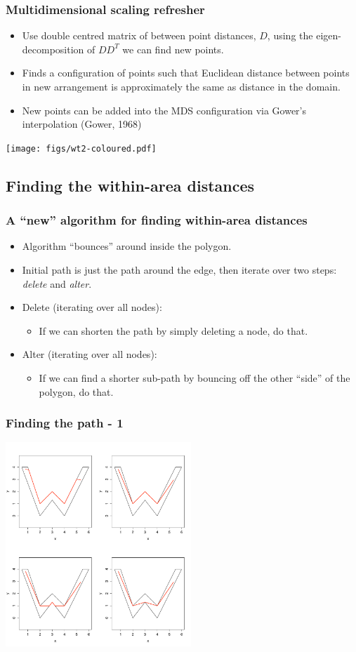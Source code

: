 \documentclass[ignorenonframetext]{beamer} %
\newcommand{\bi}{\begin{itemize}}
\newcommand{\ei}{\end{itemize}}
\begin{document}
\begin{frame}
	\frametitle{Multidimensional scaling refresher}
       \bi
         \item Use double centred matrix of between point distances, $D$, using the eigen-decomposition of $DD^T$ we can find new points.
         \item Finds a configuration of points such that Euclidean distance between points in new arrangement is approximately the same as distance in the domain.
          \item New points can be added into the MDS configuration via Gower's interpolation (Gower, 1968)
        \ei
            \centering
              \texttt{[image: figs/wt2-coloured.pdf]}\\
        
\end{frame}

\subsection{Finding the within-area distances}

\begin{frame}
	\frametitle{A ``new'' algorithm for finding within-area distances}
	\bi
		\item Algorithm ``bounces'' around inside the polygon.
		\item Initial path is just the path around the edge, then iterate over two steps: \textit{delete} and \textit{alter}.
		\item Delete (iterating over all nodes):
			\bi \item If we can shorten the path by simply deleting a node, do that.
			\ei
		\item Alter (iterating over all nodes):
			\bi \item If we can find a shorter sub-path by bouncing off the other ``side'' of the polygon, do that.
			\ei
	\ei
\end{frame}



\begin{frame}
	\frametitle{Finding the path - 1}
            \centering
              \includegraphics[width=2.75in]{figs/wood-2}\\
\end{frame}
\end{document}
